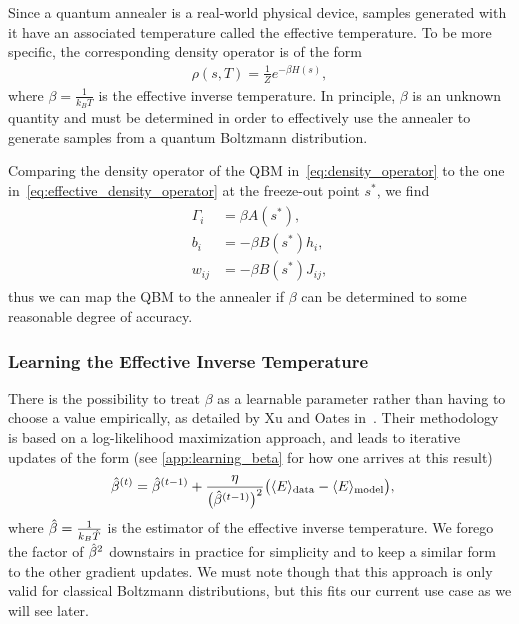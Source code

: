 Since a quantum annealer is a real-world physical device, samples generated with it have an associated temperature called the effective temperature.
To be more specific, the corresponding density operator is of the form
\begin{align}
    \rho(s, T) = \frac{1}{Z} e^{-\beta H(s)},
\label{eq:effective_density_operator}
\end{align}
where \( \beta = \frac{1}{k_B T} \) is the effective inverse temperature.
In principle, \( \beta \) is an unknown quantity and must be determined in order to effectively use the annealer to generate samples from a quantum Boltzmann distribution.

Comparing the density operator of the QBM in~\cref{eq:density_operator} to the one in~\cref{eq:effective_density_operator} at the freeze-out point \( s^* \), we find
\begin{align}
\begin{split}
    \Gamma_i
        &= \beta A(s^*), \\
    b_i
        &= -\beta B(s^*) h_i, \\
    w_{ij}
        &= -\beta B(s^*) J_{ij},
    \label{eq:qbm_scaling}
\end{split}
\end{align}
thus we can map the QBM to the annealer if \( \beta \) can be determined to some reasonable degree of accuracy.

\subsubsection{Learning the Effective Inverse Temperature}\label{sec:learning_beta}
There is the possibility to treat \( \beta \) as a learnable parameter rather than having to choose a value empirically, as detailed by Xu and Oates in~\cite{xu_2021}.
Their methodology is based on a log-likelihood maximization approach, and leads to iterative updates of the form (see \cref{app:learning_beta} for how one arrives at this result)
\begin{align}
    \hat{\beta}^{(t)}
        &= \hat{\beta}^{(t-1)} + \frac{\eta}{\big(\hat{\beta}^{(t-1)}\big)^2}\big(\langle E \rangle_\text{data} - \langle E \rangle_\text{model}\big),
\end{align}
where \( \hat{\beta} = \frac{1}{k_B\hat{T}} \) is the estimator of the effective inverse temperature.
We forego the factor of \( \hat{\beta}^2 \) downstairs in practice for simplicity and to keep a similar form to the other gradient updates.
We must note though that this approach is only valid for classical Boltzmann distributions, but this fits our current use case as we will see later.

